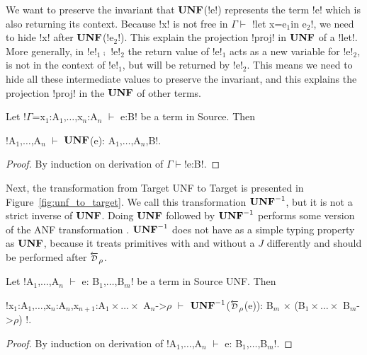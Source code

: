 We want to preserve the invariant that $\mathbf{UNF}$(!e!) represents the term !e! which is also returning its context. 
Because !x! is not free in $\Gamma \vdash$ !let x=e$_1$in e$_2$!, we need to hide !x! after $\mathbf{UNF}$(!e$_2$!).
This explain the projection !proj! in $\mathbf{UNF}$ of a !let!. 
More generally, in !e!$_{1} \comp$ !e!$_{2}$ the return value of !e!$_{1}$ acts as a new variable for !e!$_{2}$, 
is not in the context of !e!$_{1}$, but will be returned by !e!$_{2}$.
This means we need to hide all these intermediate values to preserve the invariant,
and this explains the projection !proj! in the $\mathbf{UNF}$ of other terms. 

\begin{lemma}
    Let !$\Gamma$=x$_1$:A$_{1}$,$\ldots$,x$_n$:A$_{n}$ $\vdash$ e:B! be a term in Source. Then
    \begin{center}
        !A$_{1}$,$\ldots$,A$_{n}$ $\vdash$ $\mathbf{UNF}$(e): A$_{1}$,$\ldots$,A$_{n}$,B!.
    \end{center}
\end{lemma}
\begin{proof}
    By induction on derivation of $\Gamma\vdash$!e:B!.
\end{proof}




Next, the transformation from Target UNF to Target is presented in Figure~\ref{fig:unf_to_target}. 
We call this transformation $\mathbf{UNF}^{-1}$, but it is not a strict inverse of $\mathbf{UNF}$.
Doing $\mathbf{UNF}$ followed by $\mathbf{UNF}^{-1}$ performs some version of the ANF transformation \cite{sabry1993reasoning}. 
$\mathbf{UNF}^{-1}$ does not have as a simple typing property as $\mathbf{UNF}$, 
because it treats primitives with and without a $J$ differently and should be performed after $\Dsynrevsymbol_{\rho}$.

\begin{lemma}
    Let !A$_{1}$,$\ldots$,A$_{n}$ $\vdash$ e: B$_{1}$,$\ldots$,B$_{m}$! be a term in Source UNF. Then
    \begin{center}
        !x$_1$:A$_{1}$,$\ldots$,x$_n$:A$_{n}$,x$_{n+1}$:A$_{1}\times\ldots\times$ A$_{n}$->$\rho$ $\vdash$ $\mathbf{UNF}^{-1}$($\Dsynrevsymbol_{\rho}$(e)): B$_m$ $\times$ (B$_{1}\times\ldots\times$ B$_{m}$->$\rho$) !.
    \end{center}
\end{lemma}
\begin{proof}
    By induction on derivation of !A$_{1}$,$\ldots$,A$_{n}$ $\vdash$ e: B$_{1}$,$\ldots$,B$_{m}$!.
\end{proof}

